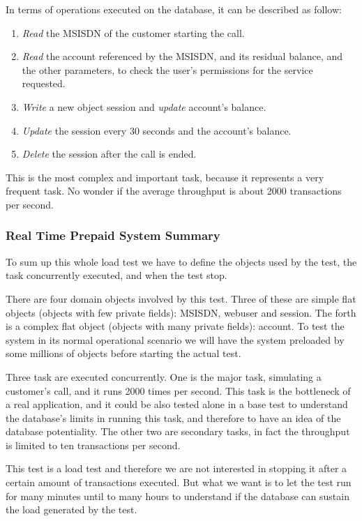 In terms of operations executed on the database, it can be described as follow:
\begin{enumerate}
	\item \emph{Read} the MSISDN of the customer starting the call.
	\item \emph{Read} the account referenced by the MSISDN, and its residual balance, and the other parameters, to check the user's permissions for the service requested.
	\item \emph{Write} a new object session and \emph{update} account's balance.
	\item \emph{Update} the session every 30 seconds and the account's balance.
	\item \emph{Delete} the session after the call is ended.
\end{enumerate}

This is the most complex and important task, because it represents a very frequent task. No wonder if the average throughput is about 2000 transactions per second.

			\subsubsection{Real Time Prepaid System Summary}
To sum up this whole load test we have to define the objects used by the test, the task concurrently executed, and when the test stop.

There are four domain objects involved by this test. Three of these are simple flat objects (objects with few private fields): MSISDN, webuser and session. The forth is a complex flat object (objects with many private fields): account. To test the system in its normal operational scenario we will have the system preloaded by some millions of objects before starting the actual test.

Three task are executed concurrently. One is the major task, simulating a customer's call, and it runs 2000 times per second. This task is the bottleneck of a real application, and it could be also tested alone in a base test to understand the database's limits in running this task, and therefore to have an idea of the database potentiality. The other two are secondary tasks, in fact the throughput is limited to ten transactions per second.

This test is a load test and therefore we are not interested in stopping it after a certain amount of transactions executed. But what we want is to let the test run for many minutes until to many hours to understand if the database can sustain the load generated by the test.
			
